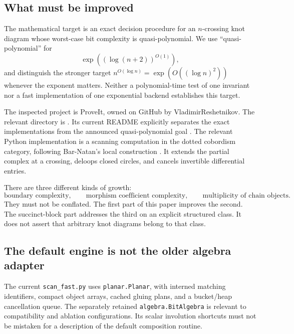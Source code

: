 \documentclass[11pt]{article}
\theoremstyle{definition}\newtheorem{definition}[theorem]{Definition}
\theoremstyle{remark}\newtheorem{remark}[theorem]{Remark}
\newcommand{\code}[1]{\texttt{#1}}
\begin{document}
\subsection{What must be improved}
The mathematical target is an exact decision procedure for an $n$-crossing knot diagram whose worst-case bit complexity is quasi-polynomial. We use ``quasi-polynomial'' for
\[
 \exp((\log(n+2))^{O(1)}),
\]
and distinguish the stronger target $n^{O(\log n)}=\exp(O((\log n)^2))$ whenever the exponent matters. Neither a polynomial-time test of one invariant nor a fast implementation of one exponential backend establishes this target.

The inspected project is ProveIt, owned on GitHub by VladimirReshetnikov. The relevant directory is . Its current README explicitly separates the exact implementations from the announced quasi-polynomial goal \cite{repo}. The relevant Python implementation is a scanning computation in the dotted cobordism category, following Bar-Natan's local construction \cite{bnfast}. It extends the partial complex at a crossing, deloops closed circles, and cancels invertible differential entries.

There are three different kinds of growth:
\begin{equation}\label{eq:threecosts}
 \text{boundary complexity},\qquad
 \text{morphism coefficient complexity},\qquad
 \text{multiplicity of chain objects}.
\end{equation}
They must not be conflated. The first part of this paper improves the second. The succinct-block part addresses the third on an explicit structured class. It does not assert that arbitrary knot diagrams belong to that class.

\subsection{The default engine is not the older algebra adapter}
The current \code{scan\_fast.py} uses \code{planar.Planar}, with interned matching identifiers, compact object arrays, cached gluing plans, and a bucket/heap cancellation queue. The separately retained \code{algebra.BitAlgebra} is relevant to compatibility and ablation configurations. Its scalar involution shortcuts must not be mistaken for a description of the default composition routine.
\end{document}
